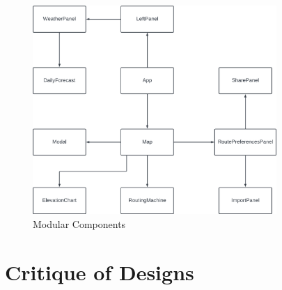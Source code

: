 \begin{figure}[!ht]
  \centering
  \includegraphics[width=350px]{figures/components.png}
  \caption{Modular Components}
  \label{fig:components}
\end{figure}


\section{Critique of Designs}
\label{design:critique}